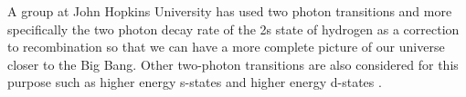 
A group at John Hopkins University\cite{recombinationB} has used two photon transitions and more specifically the two photon decay rate of the 2s state of hydrogen as a correction to recombination so that we can have a more complete picture of our universe closer to the Big Bang. Other two-photon transitions are also considered for this purpose such as higher energy s-states and higher energy d-states  \cite{recombinationA}.

